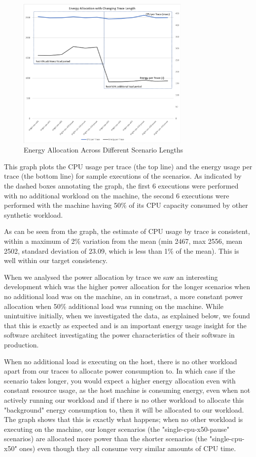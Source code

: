 \begin{figure}
\centering
\includegraphics[width=0.75\textwidth]{Figures/validation-scenariolength}
\caption{Energy Allocation Across Different Scenario Lengths}
\label{figure:validation-scenariolength}
\end{figure}

This graph plots the CPU usage per trace (the top line) and the energy usage per trace (the bottom line) for sample executions of the scenarios.  As indicated by the dashed boxes annotating the graph, the first 6 executions were performed with no additional workload on the machine, the second 6 executions were performed with the machine having 50\% of its CPU capacity consumed by other synthetic workload.

As can be seen from the graph, the estimate of CPU usage by trace is consistent, within a maximum of 2\% variation from the mean (min 2467, max 2556, mean 2502, standard deviation of 23.09, which is less than 1\% of the mean).  This is well within our target consistency.

When we analysed the power allocation by trace we saw an interesting development which was the higher power allocation for the longer scenarios when no additional load was on the machine, an in constrast, a more constant power allocation when 50\% additional load was running on the machine.  While unintuitive initially, when we investigated the data, as explained below, we found that this is exactly as expected and is an important energy usage insight for the software architect investigating the power characteristics of their software in production.  

When no additional load is executing on the host, there is no other workload apart from our traces to allocate power consumption to.  In which case if the scenario takes longer, you would expect a higher energy allocation even with constant resource usage, as the host machine is consuming energy, even when not actively running our workload and if there is no other workload to allocate this "background" energy consumption to, then it will be allocated to our workload.  The graph shows that this is exactly what happens; when no other workload is executing on the machine, our longer scenarios (the "single-cpu-x50-pause" scenarios) are allocated more power than the shorter scenarios (the "single-cpu-x50" ones) even though they all consume very similar amounts of CPU time.

